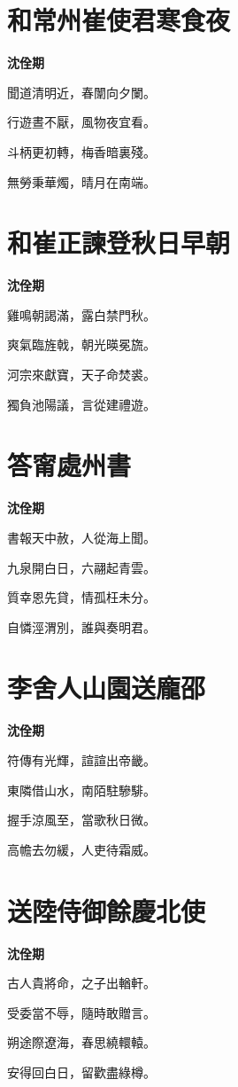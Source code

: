 \documentclass[12pt,a4paper]{ctexbook}
\begin{document}
\section{和常州崔使君寒食夜}
\textbf{沈佺期}\par\vspace{0.5em}
聞道清明近，春闈向夕闌。\par
行遊晝不厭，風物夜宜看。\par
斗柄更初轉，梅香暗裏殘。\par
無勞秉華燭，晴月在南端。\par

\section{和崔正諫登秋日早朝}
\textbf{沈佺期}\par\vspace{0.5em}
雞鳴朝謁滿，露白禁門秋。\par
爽氣臨旌戟，朝光暎冕旒。\par
河宗來獻寶，天子命焚裘。\par
獨負池陽議，言從建禮遊。\par

\section{答甯處州書}
\textbf{沈佺期}\par\vspace{0.5em}
書報天中赦，人從海上聞。\par
九泉開白日，六翮起青雲。\par
質幸恩先貸，情孤枉未分。\par
自憐涇渭別，誰與奏明君。\par

\section{李舍人山園送龐邵}
\textbf{沈佺期}\par\vspace{0.5em}
符傳有光輝，諠諠出帝畿。\par
東隣借山水，南陌駐驂騑。\par
握手涼風至，當歌秋日微。\par
高幨去勿緩，人吏待霜威。\par

\section{送陸侍御餘慶北使}
\textbf{沈佺期}\par\vspace{0.5em}
古人貴將命，之子出輶軒。\par
受委當不辱，隨時敢贈言。\par
朔途際遼海，春思繞轘轅。\par
安得回白日，留歡盡綠樽。\par
\end{document}
